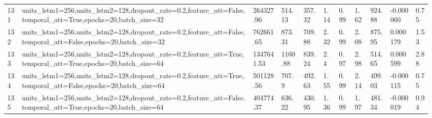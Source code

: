 \begin{longtable}{C{0.8cm} L{2cm} C{1.15cm} C{1.15cm} C{1.15cm} C{1.15cm} C{0.85cm} C{1.25cm} C{1.2cm} C{1.5cm} C{1.0cm}}
131 & units\_lstm1=256,\newline units\_lstm2=128,\newline dropout\_rate=0.2,\newline feature\_att=False,\newline temporal\_att=True,\newline epochs=20,\newline batch\_size=32 & 264327.96 & 514.13 & 357.32 & 1.14 & 0.99 & 1.62 & 924.88 & -0.000060 & 0.75 \\
132 & units\_lstm1=256,\newline units\_lstm2=128,\newline dropout\_rate=0.2,\newline feature\_att=False,\newline temporal\_att=False,\newline epochs=20,\newline batch\_size=32 & 762661.65 & 873.31 & 709.88 & 2.32 & 0.99 & 2.08 & 875.95 & 0.000179 & 1.53 \\
133 & units\_lstm1=256,\newline units\_lstm2=128,\newline dropout\_rate=0.2,\newline feature\_att=True,\newline temporal\_att=True,\newline epochs=20,\newline batch\_size=64 & 1347641.53 & 1160.88 & 839.24 & 2.4 & 0.97 & 2.98 & 514.65 & 0.000599 & 2.88 \\
134 & units\_lstm1=256,\newline units\_lstm2=128,\newline dropout\_rate=0.2,\newline feature\_att=True,\newline temporal\_att=False,\newline epochs=20,\newline batch\_size=64 & 501128.56 & 707.9 & 492.63 & 1.55 & 0.99 & 2.14 & 499.03 & -0.000115 & 0.75 \\
135 & units\_lstm1=256,\newline units\_lstm2=128,\newline dropout\_rate=0.2,\newline feature\_att=False,\newline temporal\_att=True,\newline epochs=20,\newline batch\_size=64 & 404774.37 & 636.22 & 430.95 & 1.36 & 0.99 & 1.97 & 481.34 & -0.000019 & 0.94 \\

\end{longtable}
